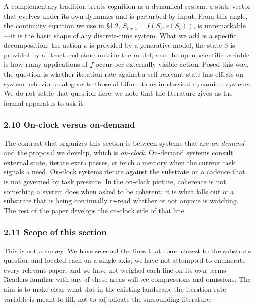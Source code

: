 \documentclass[11pt,letterpaper]{article}
\begin{document}
A complementary tradition treats cognition as a dynamical system: a state vector that evolves under its own dynamics and is perturbed by input. From this angle, the continuity equation we use in §1.2, $S_{t+1} = f(S_t, a(S_t))$, is unremarkable---it is the basic shape of any discrete-time system. What we add is a specific decomposition: the action $a$ is provided by a generative model, the state $S$ is provided by a structured store outside the model, and the open scientific variable is how many applications of $f$ occur per externally visible action. Posed this way, the question is whether iteration rate against a self-relevant state has effects on system behavior analogous to those of bifurcations in classical dynamical systems. We do not settle that question here; we note that the literature gives us the formal apparatus to ask it.

\subsubsection*{2.10 On-clock versus on-demand}

The contrast that organizes this section is between systems that are \emph{on-demand} and the proposal we develop, which is \emph{on-clock}. On-demand systems consult external state, iterate extra passes, or fetch a memory when the current task signals a need. On-clock systems iterate against the substrate on a cadence that is not governed by task pressure. In the on-clock picture, coherence is not something a system does when asked to be coherent; it is what falls out of a substrate that is being continually re-read whether or not anyone is watching. The rest of the paper develops the on-clock side of that line.

\subsubsection*{2.11 Scope of this section}

This is not a survey. We have selected the lines that come closest to the substrate question and located each on a single axis; we have not attempted to enumerate every relevant paper, and we have not weighed each line on its own terms. Readers familiar with any of these areas will see compressions and omissions. The aim is to make clear what slot in the existing landscape the iteration-rate variable is meant to fill, not to adjudicate the surrounding literature.
\end{document}
